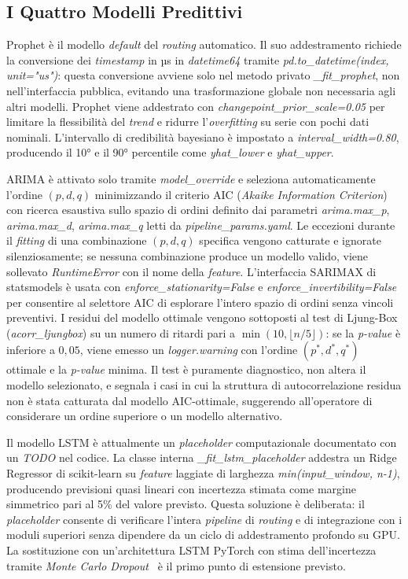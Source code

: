 \subsection{I Quattro Modelli Predittivi}
\label{subsec:modelli_predittivi_impl}

Prophet è il modello \textit{default} del \textit{routing} automatico. Il suo addestramento
richiede la conversione dei \textit{timestamp} in µs in \textit{datetime64} tramite
\textit{pd.to\_datetime(index, unit="us")}: questa conversione avviene solo nel metodo privato
\textit{\_fit\_prophet}, non nell'interfaccia pubblica, evitando una trasformazione globale non
necessaria agli altri modelli. Prophet viene addestrato con \textit{changepoint\_prior\_scale=0.05}
per limitare la flessibilità del \textit{trend} e ridurre l'\textit{overfitting} su serie con
pochi dati nominali. L'intervallo di credibilità bayesiano è impostato a
\textit{interval\_width=0.80}, producendo il 10° e il 90° percentile come \textit{yhat\_lower}
e \textit{yhat\_upper}.

ARIMA è attivato solo tramite \textit{model\_override} e seleziona automaticamente l'ordine
$(p, d, q)$ minimizzando il criterio AIC (\textit{Akaike Information Criterion}) con ricerca
esaustiva sullo spazio di ordini definito dai parametri \textit{arima.max\_p},
\textit{arima.max\_d}, \textit{arima.max\_q} letti da \textit{pipeline\_params.yaml}. Le
eccezioni durante il \textit{fitting} di una combinazione $(p, d, q)$ specifica vengono catturate
e ignorate silenziosamente; se nessuna combinazione produce un modello valido, viene sollevato
\textit{RuntimeError} con il nome della \textit{feature}. L'interfaccia SARIMAX di statsmodels è
usata con \textit{enforce\_stationarity=False} e \textit{enforce\_invertibility=False} per
consentire al selettore AIC di esplorare l'intero spazio di ordini senza vincoli preventivi. I
residui del modello ottimale vengono sottoposti al test di Ljung-Box
(\textit{acorr\_ljungbox}) su un numero di ritardi pari a
$\min(10,\lfloor n/5 \rfloor)$: se la \textit{p-value} è inferiore a $0{,}05$, viene
emesso un \textit{logger.warning} con l'ordine $(p^*,d^*,q^*)$ ottimale e la
\textit{p-value} minima. Il test è puramente diagnostico, non altera il modello
selezionato, e segnala i casi in cui la struttura di autocorrelazione residua
non è stata catturata dal modello AIC-ottimale, suggerendo all'operatore di
considerare un ordine superiore o un modello alternativo.

Il modello LSTM è attualmente un \textit{placeholder} computazionale documentato con un
\textit{TODO} nel codice. La classe interna \textit{\_fit\_lstm\_placeholder} addestra un Ridge
Regressor di scikit-learn su \textit{feature} laggiate di larghezza
\textit{min(input\_window, n-1)}, producendo previsioni quasi lineari con incertezza stimata come
margine simmetrico pari al 5\% del valore previsto. Questa soluzione è deliberata: il
\textit{placeholder} consente di verificare l'intera \textit{pipeline} di \textit{routing} e di
integrazione con i moduli superiori senza dipendere da un ciclo di addestramento profondo su GPU.
La sostituzione con un'architettura LSTM PyTorch con stima dell'incertezza tramite \textit{Monte
Carlo Dropout}~\cite{gal2016} è il primo punto di estensione previsto.


